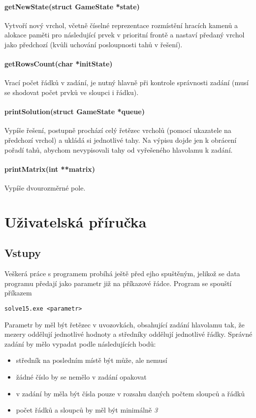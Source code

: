 \documentclass[12pt,titlepage]{article}
\begin{document}
\paragraph{getNewState(struct GameState *state)}
Vytvoří nový vrchol, včetně číselné reprezentace rozmístění hracích kamenů a alokace paměti pro následující prvek v prioritní frontě a nastaví předaný vrchol jako předchozí (kvůli uchování posloupnosti tahů v řešení).
\paragraph{getRowsCount(char *initState)}
Vrací počet řádků v zadání, je nutný hlavně při kontrole správnosti zadání (musí se shodovat počet prvků ve sloupci i řádku).
\paragraph{printSolution(struct GameState *queue)}
Vypíše řešení, postupně prochází celý řetězec vrcholů (pomocí ukazatele na předchozí vrchol) a ukládá si jednotlivé tahy. Na výpisu dojde jen k obrácení pořadí tahů, abychom nevypisovali tahy od vyřešeného hlavolamu k zadání.
\paragraph{printMatrix(int **matrix)}
Vypíše dvourozměrné pole.

\section{Uživatelská příručka}

\subsection{Vstupy}
Veškerá práce s programem probíhá ještě před ejho spuštěným, jelikož se data programu předají jako parametr již na příkazové řádce. Program se spouští příkazem
\begin{center}
\begin{verbatim}
solve15.exe <parametr>
\end{verbatim}
\end{center}

\par
Parametr by měl být řetězec v uvozovkách, obsahující zadání hlavolamu tak, že mezery oddělují jednotlivé hodnoty a středníky oddělují jednotlivé řádky. Správné zadání by mělo vypadat podle následujících bodů:
\begin{itemize}
\item středník na posledním místě být může, ale nemusí
\item žádné číslo by se nemělo v zadání opakovat
\item v zadání by měla být čísla pouze v rozsahu daných počtem sloupců a řádků
\item počet řádků a sloupců by měl být minimálně \textit{3}
\end{itemize}
\end{document}

